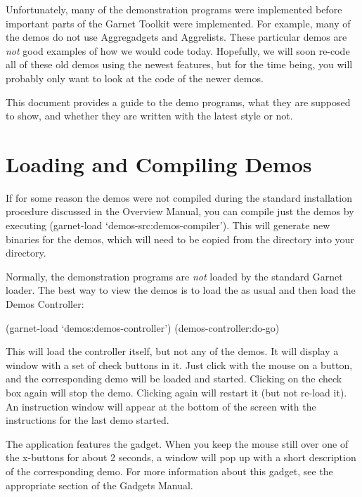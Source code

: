 Unfortunately, many of the demonstration programs were implemented before
important parts of the Garnet Toolkit were implemented.  For example, many
of the demos do not use Aggregadgets and Aggrelists.  These
particular demos are
{\it not} good examples of how we would code today.  Hopefully, we will soon
re-code all of these old demos using the newest features, but for the time
being, you will probably only want to look at the code of the newer demos.

This document provides a guide to the demo programs, what they are supposed
to show, and whether they are written with the latest style or not.


\section{Loading and Compiling Demos}
\label{loadingandcompilingdemos}

If for some reason the demos were not compiled during the standard installation
procedure discussed in the Overview Manual, you can compile just the demos
by executing (garnet-load `demos-src:demos-compiler').  This will generate
new binaries for the demos, which will need to be copied from the
 directory into your  directory.

Normally, the demonstration programs are {\it not} loaded by the standard
Garnet loader.  The best way to view the demos is to load the
 as usual and then load the Demos Controller:
\begin{programexample}
(garnet-load `demos:demos-controller')
(demos-controller:do-go)
\end{programexample}

This will load the controller itself, but not any of the demos.  It will
display a window with a set of check buttons in it.  Just click with the mouse
on a button, and the corresponding demo will be loaded and started.
Clicking on the check box again will stop the demo.  Clicking again will
restart it (but not re-load it).  An instruction window will appear at the
bottom of the screen with the instructions for the last demo started.

The  application features the  gadget.
When you keep the mouse still over one of the x-buttons for about 2 seconds,
a window will pop up with a short description of the corresponding demo.
For more information about this gadget, see the appropriate section of the
Gadgets Manual.

